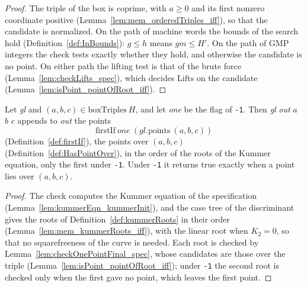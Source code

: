 \begin{proof}
  \leanok
  The triple of the box is coprime, with $a \ge 0$ and its first nonzero coordinate positive
  (Lemma~\ref{lem:mem_orderedTriples_iff}), so that the candidate is normalized. On the path of
  machine words the bounds of the search hold (Definition~\ref{def:InBounds}): $g \le h$ means $gm
  \le H'$. On the path of GMP integers the check tests exactly whether they hold, and otherwise the
  candidate is no point. On either path the lifting test is that of the brute force
  (Lemma~\ref{lem:checkLifts_spec}), which decides
  $\mathrm{Lifts}$ on the candidate (Lemma~\ref{lem:isPoint_pointOfRoot_iff}).
\end{proof}

\begin{lemma}\label{lem:checkOnePoint_spec}
  \leanok
  Let  \textit{gl} and $(a, b, c) \in \mathrm{boxTriples}\ H$, and
  let \textit{one} be the flag of \texttt{-1}. Then  \textit{gl}
  \textit{out} $a$ $b$ $c$ appends to \textit{out} the points
  \[
    \mathrm{firstIf}\ \mathit{one}\ (\mathit{gl}.\mathrm{points}\ (a, b, c))
  \]
  (Definition~\ref{def:firstIf}), the points over $(a, b, c)$ (Definition~\ref{def:HasPointOver}),
  in the order of the roots of the Kummer equation, only the first under \texttt{-1}. Under
  \texttt{-1} it returns true exactly when a point lies over $(a, b, c)$.
\end{lemma}

\begin{proof}
  \leanok
  The check computes the Kummer equation of the specification
  (Lemma~\ref{lem:kummerEqn_kummerInit}), and the case tree of the discriminant gives the roots of
  Definition~\ref{def:kummerRoots} in their order (Lemma~\ref{lem:mem_kummerRoots_iff}), with the
  linear root when $K_2 = 0$, so that no squarefreeness of the curve is needed. Each root is checked
  by Lemma~\ref{lem:checkOnePointFinal_spec}, whose candidates are those over the triple
  (Lemma~\ref{lem:isPoint_pointOfRoot_iff}); under \texttt{-1} the second root is checked only when
  the first gave no point, which leaves the first point.
\end{proof}

